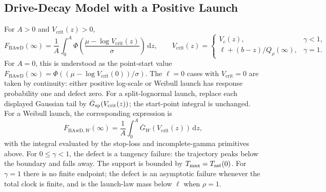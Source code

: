 \documentclass[12pt]{article}
\newcommand{\dd}{\,\mathrm{d}}
\newcommand{\PhiN}{\Phi}
\newcommand{\Gbar}{\bar{G}}
\theoremstyle{remark}
\begin{document}
\subsection{Drive-Decay Model with a Positive Launch}
For $A>0$ and $V_{\mathrm{crit}}(z)>0$,
\begin{equation}
 F_{\mathrm{BAwD}}(\infty)
 =\frac{1}{A}\int_0^A
 \PhiN\!\left(\frac{\mu-\log V_{\mathrm{crit}}(z)}{\sigma}\right)\dd z,
 \qquad
 V_{\mathrm{crit}}(z)=
 \begin{cases}
 V_c(z),&\gamma<1,\\
 \ell+(b-z)/Q_\rho(\infty),&\gamma=1.
 \end{cases}
 \label{eq:bawd-defect-logn}
\end{equation}
For $A=0$, this is understood as the point-start value $F_{\mathrm{BAwD}}(\infty)=
\PhiN((\mu-\log V_{\mathrm{crit}}(0))/\sigma)$. The $\ell=0$ cases with
$V_{\mathrm{crit}}=0$ are taken by continuity: either positive log-scale or Weibull launch has response probability one and defect zero. For a split-lognormal launch, replace each displayed Gaussian tail by $\Gbar_{\rm sp}(V_{\mathrm{crit}}(z))$; the start-point integral is unchanged. For a Weibull launch, the corresponding expression is
\begin{equation}
  F_{\mathrm{BAwD},W}(\infty)
   =\frac{1}{A}\int_0^A \Gbar_W\!\left(V_{\mathrm{crit}}(z)\right)\dd z,
  \label{eq:bawd-defect-weibull}
\end{equation}
with the integral evaluated by the stop-loss and incomplete-gamma primitives above. For $0\le\gamma<1$, the defect is a tangency failure: the trajectory peaks below the boundary and falls away. The support is bounded by $T_{\max}=T_{\rm sat}(0)$. For $\gamma=1$ there is no finite endpoint; the defect is an asymptotic failure whenever the total clock is finite, and is the launch-law mass below $\ell$ when $\rho=1$.
\end{document}
